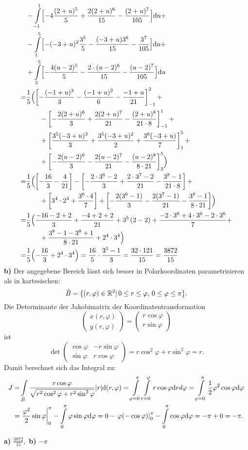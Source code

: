 {\begin{align*}
& - \int\limits_{-1}^1\Bigl[ -4\frac{(2+u)^5}5 + \frac{2(2+u)^6}{15}-\frac{(2+u)^7}{105}\Bigr]\mathrm{d} u+\\
& -\int\limits_{1}^5\Bigl[ -(-3+u)^2\frac{3^5}5- \frac{(-3+u)3^6}{15}-\frac{3^7}{105}\Bigr]\mathrm{d} u+\\
& + \int\limits_{3}^5\Bigl[ -\frac{4(u-2)^5}5-\frac{2 \cdot (u-2)^6}{15}-\frac{(u-2)^7}{105}\Bigr]\mathrm{d}
u\\
=&\frac 15 \Bigl( \left[-\frac{(-1+u)^3}3 - \frac{(-1+u)^2}{6} - \frac{-1+u}{21}\right]_{-1}^3 + \\
&\qquad -\left[ -\frac{2(2+u)^6}{3}  +\frac{2(2+u)^7}{21} - \frac{(2+u)^8}{21\cdot 8}\right]_{-1}^1
+ \\
&\qquad + \left[ \frac{3^5(-3+u)^3}{3} + \frac{3^5(-3+u)^2}{2} + \frac{3^6(-3+u)}{7}\right]_{1}^5+\\
&\qquad + \left[-\frac{2(u-2)^6}{3} - \frac{2(u-2)^7}{21} - \frac{(u-2)^8}{8\cdot
21}\right]_3^5\Bigr)\\
=& \frac 15 \Bigl( \left[-\frac{16}3-\frac{4}{21} \right] - \left[-\frac{2\cdot 3^6-2}3
+ \frac{2\cdot 3^7-2}{21}-\frac{3^8-1}{21\cdot 8}\right] + \\
&\qquad + \left[3^4\cdot 2^4+\frac{3^6\cdot 4}{7}\right] + \left[ -\frac{2(3^6-1)}3
- \frac{2(3^7-1)}{21}-\frac{3^8-1}{8\cdot 21}\right]\Bigr)\\
=& \frac 15 \Bigl( \frac{-16-2+2}3+\frac{-4+2+2}{21}+3^5\left( 2-2\right)+\frac{-2\cdot 3^6+4\cdot
3^6-2\cdot 3^6}{7}+\\
&\qquad + \frac{3^8-1-3^8+1}{8\cdot 21}+2^4\cdot 3^4\Bigr)\\
=& \frac 15 \Bigl( -\frac{16}3 +2^4\cdot 3^4\Bigr) = \frac{16}5\cdot \frac {3^5-1}3 = \frac{32\cdot 121}{15}=\frac{3872}{15}
\end{align*}
\textbf{ b)}  Der angegebene Bereich l\"asst sich besser in Polarkoordinaten parametrisieren als in
kartesischen: 
$$\tilde B = \{(r,\varphi)\in\mathbb{R}^2|\, 0\leq r\leq \varphi,\, 0\leq \varphi\leq \pi\}.$$
Die Determinante der Jakobimatrix der Koordinatentransformation 
$$\begin{pmatrix}x(r,\varphi)\\y(r,\varphi)\end{pmatrix}=\begin{pmatrix}r\cos\varphi\\r\sin\varphi\end{pmatrix}$$ 
ist
$$\det \begin{pmatrix}\cos\varphi&-r\sin\varphi\\ \sin\varphi&r\cos\varphi\end{pmatrix}=
r\cos^2\varphi + r\sin^2\varphi=r.$$
Damit berechnet sich das Integral zu:
\begin{align*}
J=& \int\limits_{\tilde B} \frac{r\cos \varphi}{\sqrt{r^2\cos^2\varphi+ r^2\sin^2\varphi}}|r|\mathrm{d}
(r,\varphi)
= \int\limits_{\varphi=0}^\pi \int\limits_{r=0}^\varphi r\cos\varphi \mathrm{d} r
d\varphi=\int\limits_{\varphi=0}^\pi \frac 12 \varphi^2\cos\varphi\mathrm{d}\varphi\\
=& \left.\frac {\varphi^2}2 \sin\varphi\right|_0^\pi
- \int\limits_0^\pi \varphi \sin\varphi \mathrm{d}\varphi = 0-\left.\varphi(-\cos\varphi)\right|_{0}^\pi
- \int\limits_0^\pi \cos\varphi\mathrm{d}\varphi = -\pi +0=-\pi. 
\end{align*}
}

{
\textbf{a)} $\frac{3872}{15}$,\, \textbf{b)} $-\pi$
}

